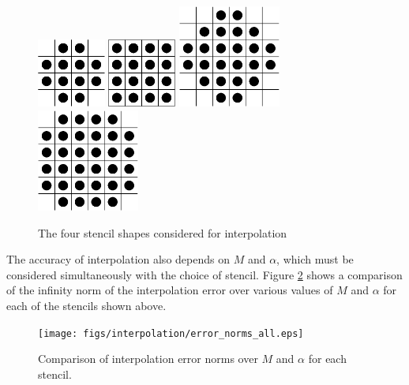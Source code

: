 \documentclass{report}
\begin{document}
\begin{figure}[h!]
  \begin{center}
    \includegraphics[width=0.2\textwidth]{figs/stencils/4x4_no_corners_centered.eps}
    \hspace{1.1 cm}
    \includegraphics[width=0.2\textwidth]{figs/stencils/4x4_centered.eps}
    \linebreak
    \includegraphics[width=0.3\textwidth]{figs/stencils/4x4+2_centered.eps}
    \includegraphics[width=0.3\textwidth]{figs/stencils/6x6_no_corners_centered.eps}
    \caption{The four stencil shapes considered for interpolation}
    \label{fig:stencils}
  \end{center}
\end{figure}

The accuracy of interpolation also depends on $M$ and $\alpha$, which must be considered simultaneously with the choice of stencil. Figure \ref{fig:errors_all} shows a comparison of the infinity norm of the interpolation error over various values of $M$ and $\alpha$ for each of the stencils shown above.

\begin{figure}[h!]
  \begin{center}
    \texttt{[image: figs/interpolation/error\_norms\_all.eps]}
    \caption{Comparison of interpolation error norms over $M$ and $\alpha$ for each stencil.}
    \label{fig:errors_all}
  \end{center}
\end{figure}




\end{document}
